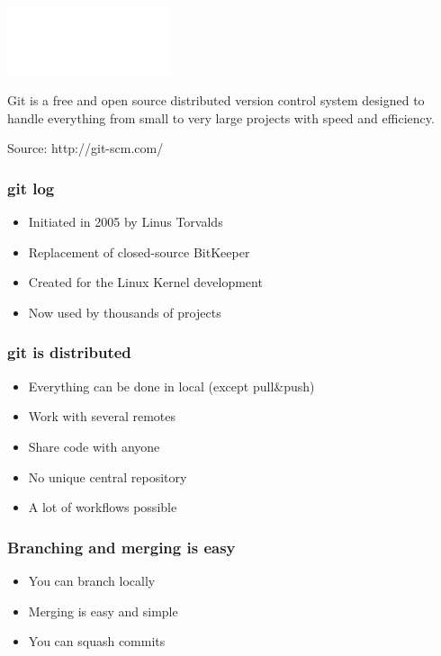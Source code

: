 \begin{frame}
    \begin{center}
        \includegraphics[height=2cm]{git.png}
    \end{center}
    \begin{center}
        Git is a free and open source\pause{} distributed\pause{} version control system\pause{} designed to handle everything from small to very large projects\pause{} with speed and efficiency.
    \end{center}
    \begin{flushright}
        Source: http://git-scm.com/
    \end{flushright}
\end{frame}
\begin{frame}
    \frametitle{git log}
    \begin{itemize}
        \item{Initiated in 2005 by Linus Torvalds}
        \item{Replacement of closed-source BitKeeper}
        \item{Created for the Linux Kernel development}
        \item{Now used by thousands of projects}
    \end{itemize}
\end{frame}
\begin{frame}
    \frametitle{git is distributed}
    \begin{itemize}
        \item Everything can be done in local (except pull\&push)
        \item Work with several remotes
        \item Share code with anyone
        \item No unique central repository
        \item A lot of workflows possible
    \end{itemize}
\end{frame}
\begin{frame}
    \frametitle{Branching and merging is easy}
    \begin{itemize}
        \item You can branch locally
        \item Merging is easy and simple
        \item You can squash commits
    \end{itemize}
\end{frame}

